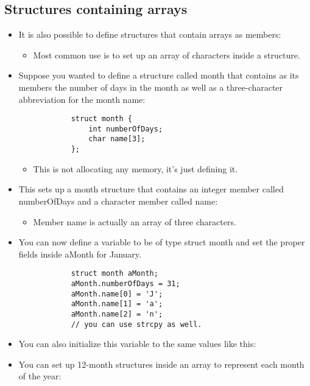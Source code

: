 \subsection{Structures containing arrays}
\begin{itemize}
    \item It is also possible to define structures that contain arrays as members:
        \begin{itemize}
            \item Most common use is to set up an array of characters inside a structure. 
        \end{itemize}
    
    \item Suppose you wanted to define a structure called month that contains as its members the number of days in the month as well as a three-character abbreviation for the month name:
        \begin{verbatim}
            struct month {
                int numberOfDays;
                char name[3];
            };
        \end{verbatim}
        \begin{itemize}
            \item This is not allocating any memory, it's just defining it. 
        \end{itemize}
    
    \item This sets up a month structure that contains an integer member called numberOfDays and a character member called name:
        \begin{itemize}
            \item Member name is actually an array of three characters.
        \end{itemize}
    
    \item You can now define a variable to be of type struct month and set the proper fields inside aMonth for January. 
        \begin{verbatim}
            struct month aMonth; 
            aMonth.numberOfDays = 31;
            aMonth.name[0] = 'J';
            aMonth.name[1] = 'a';
            aMonth.name[2] = 'n';
            // you can use strcpy as well. 
        \end{verbatim}
    
    \item You can also initialize this variable to the same values like this:
    
    \item You can set up 12-month structures inside an array to represent each month of the year:
\end{itemize}

